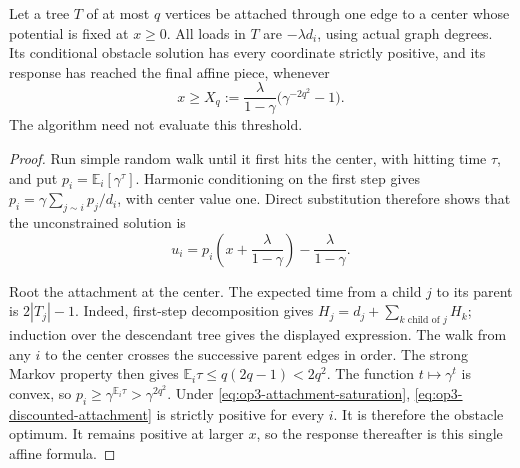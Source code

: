 \begin{lemma}
\label{lem:op3-attachment-saturation}
Let a tree $T$ of at most $q$ vertices be attached through one edge to a
center whose potential is fixed at $x\geq0$. All loads in $T$ are
$-\lambda d_i$, using actual graph degrees. Its conditional obstacle
solution has every coordinate strictly positive, and its response has
reached the final affine piece, whenever
\begin{equation}
 x\geq X_q:=\frac{\lambda}{1-\gamma}
                    \bigl(\gamma^{-2q^2}-1\bigr).
 \label{eq:op3-attachment-saturation}
\end{equation}
The algorithm need not evaluate this threshold.
\end{lemma}
\begin{proof}
Run simple random walk until it first hits the center, with hitting time
$\tau$, and put $p_i=\mathbb E_i[\gamma^\tau]$. Harmonic conditioning on
the first step gives $p_i=\gamma\sum_{j\sim i}p_j/d_i$, with center value
one. Direct substitution therefore shows that the unconstrained solution is
\begin{equation}
 u_i=p_i\left(x+\frac{\lambda}{1-\gamma}\right)
                -\frac{\lambda}{1-\gamma}.
 \label{eq:op3-discounted-attachment}
\end{equation}

Root the attachment at the center. The expected time from a child $j$ to
its parent is $2|T_j|-1$. Indeed, first-step decomposition gives
$H_j=d_j+\sum_{k\text{ child of }j}H_k$; induction over the descendant
tree gives the displayed expression. The walk from any $i$ to the center
crosses the successive parent edges in order. The strong Markov property
then gives
$\mathbb E_i\tau\leq q(2q-1)<2q^2$.
The function $t\mapsto\gamma^t$ is convex, so
$p_i\geq\gamma^{\mathbb E_i\tau}>\gamma^{2q^2}$.
Under \cref{eq:op3-attachment-saturation},
\cref{eq:op3-discounted-attachment} is strictly positive for every $i$.
It is therefore the obstacle optimum. It remains positive at larger $x$,
so the response thereafter is this single affine formula.
\end{proof}

